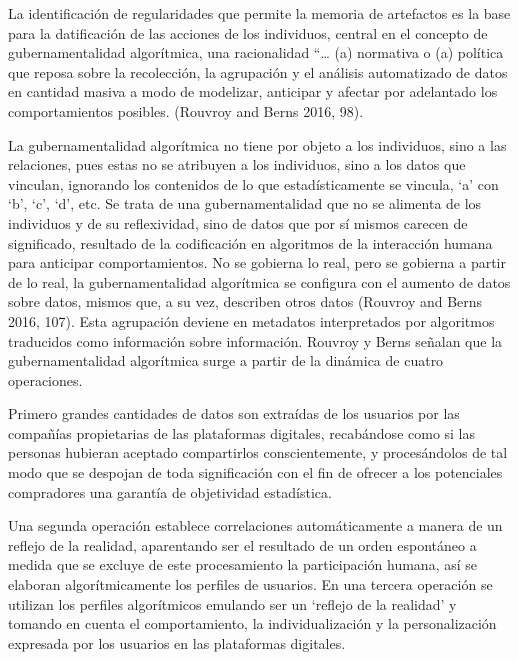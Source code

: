 \documentclass[
]{interact}
\begin{document}
La identificación de regularidades que permite la memoria de artefactos
es la base para la datificación de las acciones de los individuos,
central en el concepto de gubernamentalidad algorítmica, una
racionalidad ``\ldots{} (a) normativa o (a) política que reposa sobre la
recolección, la agrupación y el análisis automatizado de datos en
cantidad masiva a modo de modelizar, anticipar y afectar por adelantado
los comportamientos posibles. (Rouvroy and Berns 2016, 98).

La gubernamentalidad algorítmica no tiene por objeto a los individuos,
sino a las relaciones, pues estas no se atribuyen a los individuos, sino
a los datos que vinculan, ignorando los contenidos de lo que
estadísticamente se vincula, `a' con `b', `c', `d', etc. Se trata de una
gubernamentalidad que no se alimenta de los individuos y de su
reflexividad, sino de datos que por sí mismos carecen de significado,
resultado de la codificación en algoritmos de la interacción humana para
anticipar comportamientos. No se gobierna lo real, pero se gobierna a
partir de lo real, la gubernamentalidad algorítmica se configura con el
aumento de datos sobre datos, mismos que, a su vez, describen otros
datos (Rouvroy and Berns 2016, 107). Esta agrupación deviene en
metadatos interpretados por algoritmos traducidos como información sobre
información. Rouvroy y Berns señalan que la gubernamentalidad
algorítmica surge a partir de la dinámica de cuatro operaciones.

Primero grandes cantidades de datos son extraídas de los usuarios por
las compañías propietarias de las plataformas digitales, recabándose
como si las personas hubieran aceptado compartirlos conscientemente, y
procesándolos de tal modo que se despojan de toda significación con el
fin de ofrecer a los potenciales compradores una garantía de objetividad
estadística.

Una segunda operación establece correlaciones automáticamente a manera
de un reflejo de la realidad, aparentando ser el resultado de un orden
espontáneo a medida que se excluye de este procesamiento la
participación humana, así se elaboran algorítmicamente los perfiles de
usuarios. En una tercera operación se utilizan los perfiles algorítmicos
emulando ser un `reflejo de la realidad' y tomando en cuenta el
comportamiento, la individualización y la personalización expresada por
los usuarios en las plataformas digitales.
\end{document}
